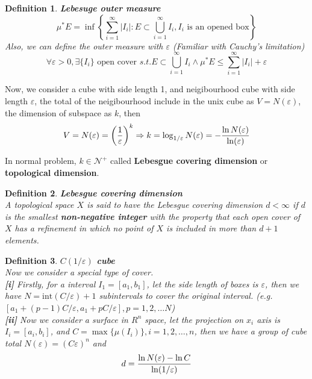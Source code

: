 \documentclass[12pt]{article}
\theoremstyle{plain}
\newtheorem{definition}{{\color{red}\textbf{Definition}}}[section]
\begin{document}
\begin{definition}\textbf{Lebesuge outer measure}
$$
\mu^*E = \inf \left\{ \sum_{i = 1}^{\infty}|I_i|: E \subset \bigcup_{i = 1}^{\infty} I_i, I_i\text{ is an opened box}\right\}
$$
  \noindent Also, we can define the outer measure with $\varepsilon$ (Familiar with Cauchy's limitation)
$$
\forall \varepsilon >0, \exists \{I_i\}\text{ open cover } s.t. E\subset\bigcup_{i = 1}^{\infty} I_i \land \mu^*E\leq \sum_{i = 1}^{\infty}|I_i| + \varepsilon
$$
\end{definition}

Now, we consider a cube with side length 1, and neigibourhood cube with side length $\varepsilon$, the total of the neigibourhood include in the unix cube as $V = N(\varepsilon)$, the dimension of subspace as $k$, then 
$$
V = N(\varepsilon) = \left(1 \over \varepsilon\right)^k \Rightarrow k = \log_{1/\varepsilon}N(\varepsilon) = - {\ln N(\varepsilon)\over \ln(\varepsilon)}
$$

In normal problem, $k \in \mathcal N^+$ called \textbf{Lebesgue covering dimension} or \textbf{topological dimension}.
\begin{definition}\textbf{Lebesgue covering dimension} 
\\\noindent A topological space $X$ is said to have the Lebesgue covering dimension $d < \infty$ if $d$ is the smallest \textbf{non-negative integer} with the property that each open cover of $X$ has a refinement in which no point of $X$ is included in more than $d + 1$ elements.
\end{definition}





\begin{definition}\textbf{$C(1/\varepsilon)$ cube}
\\\noindent Now we consider a special type of cover.
\\\noindent \textbf{[i]} Firstly, for a interval $I_1 = [a_1, b_1]$, let the side length of boxes is $\varepsilon$, then we have $N = \text{int}(C/\varepsilon) + 1$ subintervals to cover the original interval. (e.g. $[a_1 + (p - 1)C/\varepsilon, a_1 + pC/\varepsilon], p = 1, 2, \ldots N$)
\\\noindent \textbf{[ii]} Now we consider a surface in $R^n$ space, let the projection on $x_i$ axis is $I_i = [a_i, b_i]$, and $C = \max\{\mu(I_i)\}, i = 1, 2, \ldots, n$, then we have a group of cube total $N(\varepsilon) = (C\varepsilon)^n$ and 
$$
d = {\ln N(\varepsilon) - \ln C \over \ln(1/ \varepsilon)}
$$
\end{definition}
\end{document}
